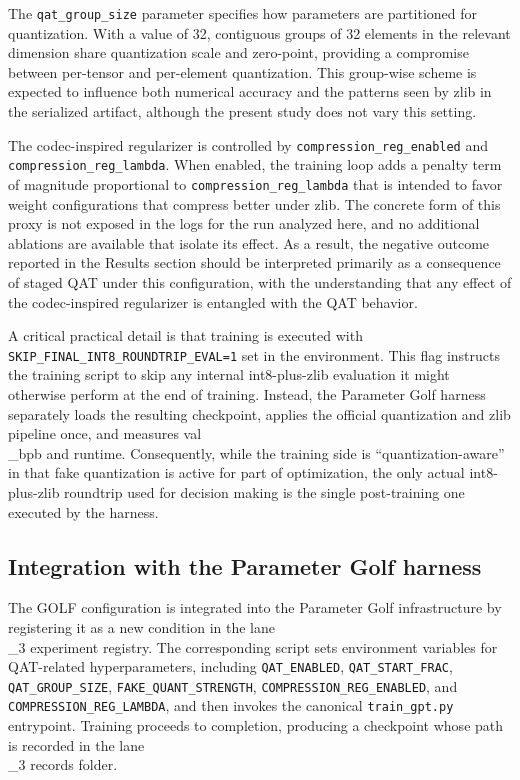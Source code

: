 \documentclass{article}
\begin{document}
The \texttt{qat\_group\_size} parameter specifies how parameters are partitioned for quantization. With a value of 32, contiguous groups of 32 elements in the relevant dimension share quantization scale and zero-point, providing a compromise between per-tensor and per-element quantization. This group-wise scheme is expected to influence both numerical accuracy and the patterns seen by zlib in the serialized artifact, although the present study does not vary this setting.

The codec-inspired regularizer is controlled by \texttt{compression\_reg\_enabled} and \texttt{compression\_reg\_lambda}. When enabled, the training loop adds a penalty term of magnitude proportional to \texttt{compression\_reg\_lambda} that is intended to favor weight configurations that compress better under zlib. The concrete form of this proxy is not exposed in the logs for the run analyzed here, and no additional ablations are available that isolate its effect. As a result, the negative outcome reported in the Results section should be interpreted primarily as a consequence of staged QAT under this configuration, with the understanding that any effect of the codec-inspired regularizer is entangled with the QAT behavior.

A critical practical detail is that training is executed with \texttt{SKIP\_FINAL\_INT8\_ROUNDTRIP\_EVAL=1} set in the environment. This flag instructs the training script to skip any internal int8-plus-zlib evaluation it might otherwise perform at the end of training. Instead, the Parameter Golf harness separately loads the resulting checkpoint, applies the official quantization and zlib pipeline once, and measures val\\_bpb and runtime. Consequently, while the training side is ``quantization-aware'' in that fake quantization is active for part of optimization, the only actual int8-plus-zlib roundtrip used for decision making is the single post-training one executed by the harness.

\subsection{Integration with the Parameter Golf harness}

\label{sec:integration_with_the_parameter_golf_harn}

The GOLF configuration is integrated into the Parameter Golf infrastructure by registering it as a new condition in the lane\\_3 experiment registry. The corresponding script sets environment variables for QAT-related hyperparameters, including \texttt{QAT\_ENABLED}, \texttt{QAT\_START\_FRAC}, \texttt{QAT\_GROUP\_SIZE}, \texttt{FAKE\_QUANT\_STRENGTH}, \texttt{COMPRESSION\_REG\_ENABLED}, and \texttt{COMPRESSION\_REG\_LAMBDA}, and then invokes the canonical \texttt{train\_gpt.py} entrypoint. Training proceeds to completion, producing a checkpoint whose path is recorded in the lane\\_3 records folder.
\end{document}
